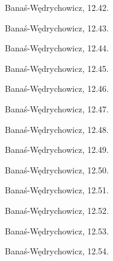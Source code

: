 \begin{integral}
    Banaś-Wędrychowicz, 12.42.
\end{integral}

\begin{integral}
    Banaś-Wędrychowicz, 12.43.
\end{integral}

\begin{integral}
    Banaś-Wędrychowicz, 12.44.
\end{integral}

\begin{integral}
    Banaś-Wędrychowicz, 12.45.
\end{integral}

\begin{integral}
    Banaś-Wędrychowicz, 12.46.
\end{integral}

\begin{integral}
    Banaś-Wędrychowicz, 12.47.
\end{integral}

\begin{integral}
    Banaś-Wędrychowicz, 12.48.
\end{integral}

\begin{integral}
    Banaś-Wędrychowicz, 12.49.
\end{integral}

\begin{integral}
    Banaś-Wędrychowicz, 12.50.
\end{integral}

\begin{integral}
    Banaś-Wędrychowicz, 12.51.
\end{integral}

\begin{integral}
    Banaś-Wędrychowicz, 12.52.
\end{integral}

\begin{integral}
    Banaś-Wędrychowicz, 12.53.
\end{integral}

\begin{integral}
    Banaś-Wędrychowicz, 12.54.
\end{integral}

